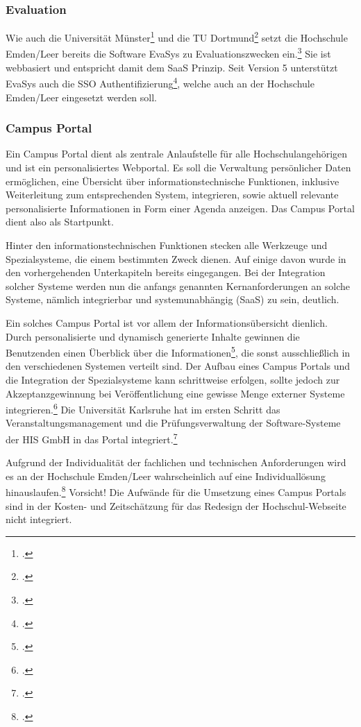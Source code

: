 \subsubsection{Evaluation}
Wie auch die Universität Münster\footcite{evasys_muenster} und die TU Dortmund\footcite{evasys_dortmund} setzt die Hochschule Emden/Leer bereits die Software EvaSys zu Evaluationszwecken ein.\footcite{gunter_muller_interview} Sie ist webbasiert und entspricht damit dem SaaS Prinzip.
Seit Version 5 unterstützt EvaSys auch die SSO Authentifizierung\footcite{evasys_sso}, welche auch an der Hochschule Emden/Leer eingesetzt werden soll.

\subsubsection{Campus Portal}
\label{subsubsection_campus_portal}
Ein Campus Portal dient als zentrale Anlaufstelle für alle Hochschulangehörigen und ist ein personalisiertes Webportal. Es soll die Verwaltung persönlicher Daten ermöglichen, eine Übersicht über informationstechnische Funktionen, inklusive Weiterleitung zum entsprechenden System, integrieren, sowie aktuell relevante personalisierte Informationen in Form einer Agenda anzeigen. Das Campus Portal dient also als Startpunkt.

Hinter den informationstechnischen Funktionen stecken alle Werkzeuge und Spezialsysteme, die einem bestimmten Zweck dienen. Auf einige davon wurde in den vorhergehenden Unterkapiteln bereits eingegangen. Bei der Integration solcher Systeme werden nun die anfangs genannten Kernanforderungen an solche Systeme, nämlich integrierbar und systemunabhängig (SaaS) zu sein, deutlich.

Ein solches Campus Portal ist vor allem der Informationsübersicht dienlich. Durch personalisierte und dynamisch generierte Inhalte gewinnen die Benutzenden einen Überblick über die Informationen\footcite[Vgl.][24]{dini_webportale_2007}, die sonst ausschließlich in den verschiedenen Systemen verteilt sind. Der Aufbau eines Campus Portals und die Integration der Spezialsysteme kann schrittweise erfolgen, sollte jedoch zur Akzeptanzgewinnung bei Veröffentlichung eine gewisse Menge externer Systeme integrieren.\footcite[Vgl.][17 f.]{dini_webportale_2007} Die Universität Karlsruhe hat im ersten Schritt das Veranstaltungsmanagement und die Prüfungsverwaltung der Software-Systeme der HIS GmbH in das Portal integriert.\footcite[Vgl.][40 f.]{dini_webportale_2007}

Aufgrund der Individualität der fachlichen und technischen Anforderungen wird es an der Hochschule Emden/Leer wahrscheinlich auf eine Individuallösung hinauslaufen.\footcite[Vgl.][21]{dini_webportale_2007} Vorsicht! Die Aufwände für die Umsetzung eines Campus Portals sind in der Kosten- und Zeitschätzung für das Redesign der Hochschul-Webseite nicht integriert.

